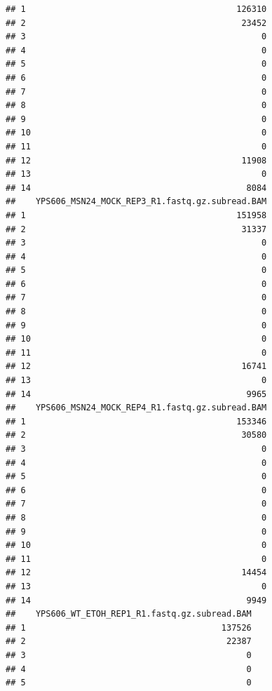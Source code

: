 \documentclass[
]{book}
\begin{document}
\begin{verbatim}
## 1                                          126310
## 2                                           23452
## 3                                               0
## 4                                               0
## 5                                               0
## 6                                               0
## 7                                               0
## 8                                               0
## 9                                               0
## 10                                              0
## 11                                              0
## 12                                          11908
## 13                                              0
## 14                                           8084
##    YPS606_MSN24_MOCK_REP3_R1.fastq.gz.subread.BAM
## 1                                          151958
## 2                                           31337
## 3                                               0
## 4                                               0
## 5                                               0
## 6                                               0
## 7                                               0
## 8                                               0
## 9                                               0
## 10                                              0
## 11                                              0
## 12                                          16741
## 13                                              0
## 14                                           9965
##    YPS606_MSN24_MOCK_REP4_R1.fastq.gz.subread.BAM
## 1                                          153346
## 2                                           30580
## 3                                               0
## 4                                               0
## 5                                               0
## 6                                               0
## 7                                               0
## 8                                               0
## 9                                               0
## 10                                              0
## 11                                              0
## 12                                          14454
## 13                                              0
## 14                                           9949
##    YPS606_WT_ETOH_REP1_R1.fastq.gz.subread.BAM
## 1                                       137526
## 2                                        22387
## 3                                            0
## 4                                            0
## 5                                            0

\end{verbatim}
\end{document}
